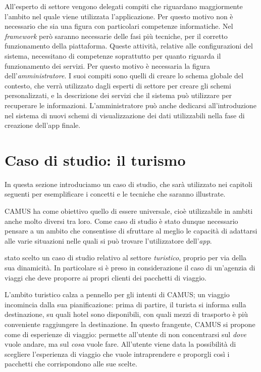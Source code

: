 All'esperto di settore vengono delegati compiti che riguardano maggiormente l'ambito nel quale viene utilizzata l'applicazione. Per questo motivo non è necessario che sia una figura con particolari competenze informatiche. Nel \emph{framework} però saranno necessarie delle fasi più tecniche, per il corretto funzionamento della piattaforma. Queste attività, relative alle configurazioni del sistema, necessitano di competenze soprattutto per quanto riguarda il funzionamento dei servizi. Per questo motivo è necessaria la figura dell'\emph{amministratore}. I suoi compiti sono quelli di creare lo schema globale del contesto, che verrà utilizzato dagli esperti di settore per creare gli schemi personalizzati, e la descrizione dei servizi che il sistema può utilizzare per recuperare le informazioni. L'amministratore può anche dedicarsi all'introduzione nel sistema di nuovi schemi di visualizzazione dei dati utilizzabili nella fase di creazione dell'app finale.

\section{Caso di studio: il turismo\label{sec:caso-studio-turismo}}

In questa sezione introduciamo un caso di studio, che sarà utilizzato nei capitoli seguenti per esemplificare i concetti e le tecniche che saranno illustrate. 

CAMUS ha come obiettivo quello di essere universale, cioè utilizzabile in ambiti anche molto diversi tra loro. Come caso di studio è stato dunque necessario pensare a un ambito che consentisse di sfruttare al meglio le capacità di adattarsi alle varie situazioni nelle quali si può trovare l'utilizzatore dell'\emph{app}.

\upe stato scelto un caso di studio relativo al settore \emph{turistico}, proprio per via della sua dinamicità. In particolare si è preso in considerazione il caso di un'agenzia di viaggi che deve proporre ai propri clienti dei pacchetti di viaggio.

L'ambito turistico calza a pennello per gli intenti di CAMUS; un viaggio incomincia dalla sua pianificazione: prima di partire, il turista si informa sulla destinazione, su quali hotel sono disponibili, con quali mezzi di trasporto è più conveniente raggiungere la destinazione. In questo frangente, CAMUS si propone come  di esperienze di viaggio: permette all'utente di non concentrarsi sul \emph{dove} vuole andare, ma sul \emph{cosa} vuole fare. All'utente viene data la possibilità di scegliere l'esperienza di viaggio che vuole intraprendere e proporgli così i pacchetti che corrispondono alle sue scelte.

